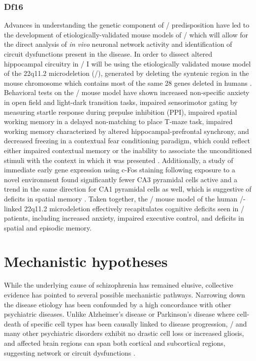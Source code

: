 \subsubsection{Df16}
Advances in understanding the genetic component of \scz/ predisposition have led to the development of etiologically-validated mouse models of \scz/ which will allow for the direct analysis of \emph{in vivo} neuronal network activity and identification of circuit dysfunctions present in the disease.
In order to dissect altered hippocampal circuitry in \scz/ I will be using the etiologically validated mouse model of the 22q11.2 microdeletion (\df/), generated by deleting the syntenic region in the mouse chromosome which contains most of the same 28 genes deleted in humans \citep{Stark2008}.
Behavioral tests on the \df/ mouse model have shown increased non-specific anxiety in open field and light-dark transition tasks, impaired sensorimotor gating by measuring startle response during prepulse inhibition (PPI), impaired spatial working memory in a delayed non-matching to place T-maze task, impaired working memory characterized by altered hippocampal-prefrontal synchrony, and decreased freezing in a contextual fear conditioning paradigm, which could reflect either impaired contextual memory or the inability to associate the unconditioned stimuli with the context in which it was presented \citep{Drew2011b, Stark2008, Sigurdsson2010}.
Additionally, a study of immediate early gene expression using c-Fos staining following exposure to a novel environment found significantly fewer CA3 pyramidal cells active and a trend in the same direction for CA1 pyramidal cells as well, which is suggestive of deficits in spatial memory \citep{Drew2011b}.
Taken together, the \df/ mouse model of the human \scz/-linked 22q11.2 microdeletion effectively recapitulates cognitive deficits seen in \scz/ patients, including increased anxiety, impaired executive control, and deficits in spatial and episodic memory.


\section{Mechanistic hypotheses}\label{sec:intro:scz:causes}
While the underlying cause of schizophrenia has remained elusive, collective evidence has pointed to several possible mechanistic pathways.
Narrowing down the disease etiology has been confounded by a high concordance with other psychiatric diseases.
Unlike Alzheimer’s disease or Parkinson’s disease where cell-death of specific cell types has been causally linked to disease progression, \scz/ and many other psychiatric disorders exhibit no drastic cell loss or increased gliosis, and affected brain regions can span both cortical and subcortical regions, suggesting network or circuit dysfunctions \citep{Uhlhaas2012, Lewis2002}.

